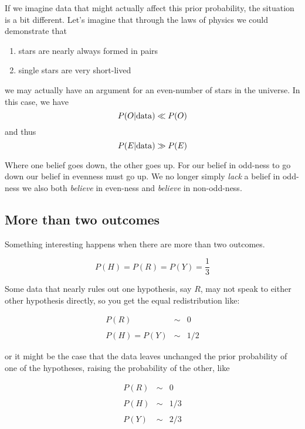 \documentclass{tufte-book}
\begin{document}
If we imagine data that might actually affect this prior probability,
the situation is a bit different. Let's imagine that through the laws of
physics we could demonstrate that

\begin{enumerate}
\def\labelenumi{\arabic{enumi}.}
\itemsep1pt\parskip0pt
\item
  stars are nearly always formed in pairs
\item
  single stars are very short-lived
\end{enumerate}

we may actually have an argument for an even-number of stars in the
universe. In this case, we have \[
P(O|{\rm data}) \ll P(O)
\] and thus \[
P(E|{\rm data}) \gg P(E)
\]

Where one belief goes down, the other goes up. For our belief in
odd-ness to go down our belief in evenness must go up. We no longer
simply \emph{lack} a belief in odd-ness we also both \emph{believe} in
even-ness and \emph{believe} in non-odd-ness.

\subsection{More than two outcomes}\label{more-than-two-outcomes}

Something interesting happens when there are more than two outcomes.

\[
P(H)=P(R)=P(Y)=\frac{1}{3}
\]

Some data that nearly rules out one hypothesis, say \(R\), may not speak
to either other hypothesis directly, so you get the equal redistribution
like:

\begin{eqnarray}
\nonumber P(R)&\sim& 0 \\\\ 
\nonumber P(H)=P(Y)&\sim& 1/2 
\end{eqnarray}

or it might be the case that the data leaves unchanged the prior
probability of one of the hypotheses, raising the probability of the
other, like

\begin{eqnarray}
\nonumber P(R)&\sim& 0 \\\\ 
\nonumber P(H)&\sim& 1/3 \\\\
\nonumber P(Y)&\sim& 2/3 
\end{eqnarray}
\end{document}
